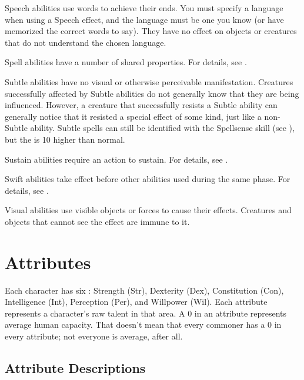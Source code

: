          Speech abilities use words to achieve their ends.
        You must specify a language when using a Speech effect, and the language must be one you know (or have memorized the correct words to say). They have no effect on objects or creatures that do not understand the chosen language.

         Spell abilities have a number of shared properties.
        For details, see .

         Subtle abilities have no visual or otherwise perceivable manifestation.
        Creatures successfully affected by Subtle abilities do not generally know that they are being influenced.
        However, a creature that successfully resists a Subtle ability can generally notice that it resisted a special effect of some kind, just like a non-Subtle ability.
        Subtle spells can still be identified with the Spellsense skill (see ), but the  is 10 higher than normal.

         Sustain abilities require an action to sustain. For details, see .

         Swift abilities take effect before other abilities used during the same phase.
        For details, see .

         Visual abilities use visible objects or forces to cause their effects.
        Creatures and objects that cannot see the effect are immune to it.

\section{Attributes}\label{Attributes}

    Each character has six : Strength (Str), Dexterity (Dex), Constitution (Con), Intelligence (Int), Perception (Per), and Willpower (Wil).
    Each attribute represents a character's raw talent in that area.
    A 0 in an attribute represents average human capacity.
    That doesn't mean that every commoner has a 0 in every attribute; not everyone is average, after all.

    \subsection{Attribute Descriptions}


